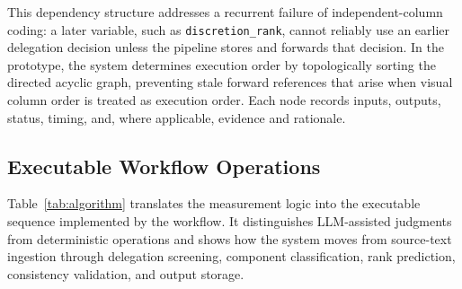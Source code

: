 \documentclass[runningheads]{llncs}
\begin{document}
This dependency structure addresses a recurrent failure of independent-column coding: a later variable, such as \texttt{discretion\_rank}, cannot reliably use an earlier delegation decision unless the pipeline stores and forwards that decision. In the prototype, the system determines execution order by topologically sorting the directed acyclic graph, preventing stale forward references that arise when visual column order is treated as execution order. Each node records inputs, outputs, status, timing, and, where applicable, evidence and rationale.


\vspace{-0.2 cm}

\subsection{Executable Workflow Operations}

Table~\ref{tab:algorithm} translates the measurement logic into the executable sequence implemented by the workflow. It distinguishes LLM-assisted judgments from deterministic operations and shows how the system moves from source-text ingestion through delegation screening, component classification, rank prediction, consistency validation, and output storage.
\end{document}
